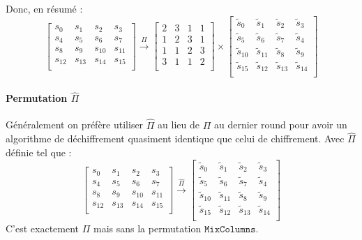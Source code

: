 \documentclass[a4paper, 12pt]{article}
\begin{document}
\noindent Donc, en résumé : 
$$
\begin{bmatrix}
	s_{0} & s_{1} & s_{2} & s_{3} \\
	s_{4} & s_{5} & s_{6} & s_{7} \\
	s_{8} & s_{9} & s_{10} & s_{11} \\
	s_{12} & s_{13} & s_{14} & s_{15} \\
\end{bmatrix}
\overset{\Pi}{\rightarrow}
\begin{bmatrix}
	2 & 3 & 1 & 1 \\
	1 & 2 & 3 & 1 \\
	1 & 1 & 2 & 3 \\
	3 & 1 & 1 & 2 \\
\end{bmatrix}
\times
\begin{bmatrix}
	\tilde{s}_0 & \tilde{s}_1 & \tilde{s}_2 & \tilde{s}_3 \\
	\tilde{s}_5 & \tilde{s}_6 & \tilde{s}_7 & \tilde{s}_4 \\
	\tilde{s}_{10} & \tilde{s}_{11} & \tilde{s}_8 & \tilde{s}_9 \\
	\tilde{s}_{15} & \tilde{s}_{12} & \tilde{s}_{13} & \tilde{s}_{14} \\
\end{bmatrix}
$$

\paragraph{Permutation $\hat{\Pi}$}
Généralement on préfère utiliser $\hat{\Pi}$ au lieu de $\Pi$  au dernier round pour avoir un algorithme de déchiffrement quasiment identique que celui de chiffrement. Avec $\hat{\Pi}$ définie tel que :
$$
\begin{bmatrix}
	s_{0} & s_{1} & s_{2} & s_{3} \\
	s_{4} & s_{5} & s_{6} & s_{7} \\
	s_{8} & s_{9} & s_{10} & s_{11} \\
	s_{12} & s_{13} & s_{14} & s_{15} \\
\end{bmatrix}
\overset{\hat{\Pi}}{\rightarrow}
\begin{bmatrix}
	\tilde{s}_0 & \tilde{s}_1 & \tilde{s}_2 & \tilde{s}_3 \\
	\tilde{s}_5 & \tilde{s}_6 & \tilde{s}_7 & \tilde{s}_4 \\
	\tilde{s}_{10} & \tilde{s}_{11} & \tilde{s}_8 & \tilde{s}_9 \\
	\tilde{s}_{15} & \tilde{s}_{12} & \tilde{s}_{13} & \tilde{s}_{14} \\
\end{bmatrix}
$$
C'est exactement $\Pi$ mais sans la permutation $\mathtt{MixColumns}$. 
\end{document}
